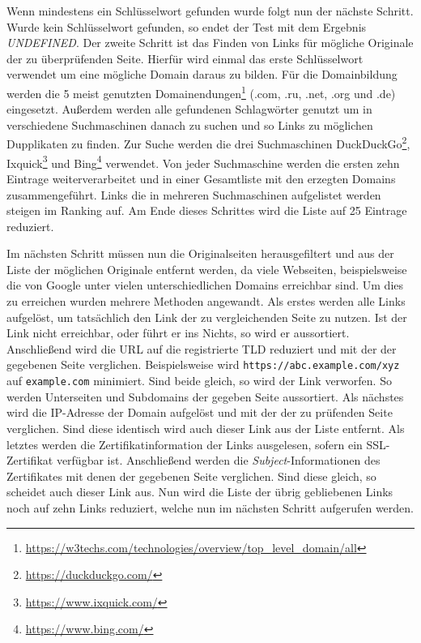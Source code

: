 Wenn mindestens ein Schlüsselwort gefunden wurde folgt nun der nächste Schritt. Wurde kein Schlüsselwort gefunden, so endet der Test mit dem Ergebnis \textit{UNDEFINED}. Der zweite Schritt ist das Finden von Links für mögliche Originale der zu überprüfenden Seite. Hierfür wird einmal das erste Schlüsselwort verwendet um eine mögliche Domain daraus zu bilden. Für die Domainbildung werden die 5 meist genutzten Domainendungen\footnote{\url{https://w3techs.com/technologies/overview/top_level_domain/all}} (.com, .ru, .net, .org und .de) eingesetzt. Außerdem werden alle gefundenen Schlagwörter genutzt um in verschiedene Suchmaschinen danach zu suchen und so Links zu möglichen Dupplikaten zu finden. Zur Suche werden die drei Suchmaschinen DuckDuckGo\footnote{\url{https://duckduckgo.com/}}, Ixquick\footnote{\url{https://www.ixquick.com/}} und Bing\footnote{\url{https://www.bing.com/}} verwendet. Von jeder Suchmaschine werden die ersten zehn Eintrage weiterverarbeitet und in einer Gesamtliste mit den erzegten Domains zusammengeführt. Links die in mehreren Suchmaschinen aufgelistet werden steigen im Ranking auf. Am Ende dieses Schrittes wird die Liste auf 25 Eintrage reduziert.

Im nächsten Schritt müssen nun die Originalseiten herausgefiltert und aus der Liste der möglichen
Originale entfernt werden, da viele Webseiten, beispielsweise die von Google unter vielen
unterschiedlichen Domains erreichbar sind. Um dies zu erreichen wurden mehrere Methoden angewandt.
Als erstes werden alle Links aufgelöst, um tatsächlich den Link der zu vergleichenden Seite zu
nutzen. Ist der Link nicht erreichbar, oder führt er ins Nichts, so wird er aussortiert.
Anschließend wird die \acs{URL} auf die registrierte \ac{TLD} reduziert und mit der der gegebenen
Seite verglichen. Beispielsweise wird \lstinline[style=eclipse]{https://abc.example.com/xyz} auf \lstinline[style=eclipse]{example.com} minimiert. Sind beide gleich, so wird der Link verworfen. So werden Unterseiten und Subdomains der gegeben Seite aussortiert. Als nächstes wird die IP-Adresse der Domain aufgelöst und mit der der zu prüfenden Seite verglichen. Sind diese identisch wird auch dieser Link aus der Liste entfernt. Als letztes werden die Zertifikatinformation der Links ausgelesen, sofern ein SSL-Zertifikat verfügbar ist. Anschließend werden die \textit{Subject}-Informationen des Zertifikates mit denen der gegebenen Seite verglichen. Sind diese gleich, so scheidet auch dieser Link aus. Nun wird die Liste der übrig gebliebenen Links noch auf zehn Links reduziert, welche nun im nächsten Schritt aufgerufen werden.

